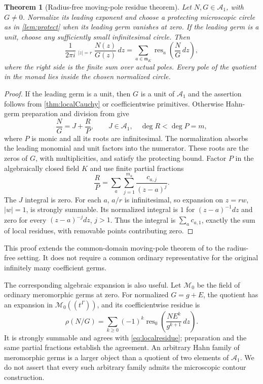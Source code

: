 \documentclass[11pt,letterpaper]{article}
\newtheorem{theorem}{Theorem}[section]
\theoremstyle{definition}
\theoremstyle{remark}
\newcommand{\Acal}{\mathscr A}
\newcommand{\m}{\mathfrak m}
\newcommand{\res}{\operatorname{res}}
\newcommand{\HCoint}{\mathop{\oint^{\!H}}\nolimits}
\numberwithin{equation}{section}
\begin{document}
\begin{theorem}[Radius-free moving-pole residue theorem]\label{thm:localresidue}
Let $N,G\in\Acal_1$, with $G\ne0$. Normalize its leading exponent and choose a protecting microscopic circle as in \cref{lem:protect} when its leading germ vanishes at zero. If the leading germ is a unit, choose any sufficiently small infinitesimal circle. Then
\begin{equation}\label{eq:localresidue}
\frac1{2\pi i}\HCoint_{|z|=r}\frac{N(z)}{G(z)}\,dz
=\sum_{a\in\m_K}\res_a\left(\frac NG\,dz\right),
\end{equation}
where the right side is the finite sum over actual poles. Every pole of the quotient in the monad lies inside the chosen normalized circle.
\end{theorem}
\begin{proof}
If the leading germ is a unit, then $G$ is a unit of $\Acal_1$ and the assertion follows from \cref{thm:localCauchy} or coefficientwise primitives. Otherwise Hahn-germ preparation and division from \cite[\S4]{AG} give
\[
\frac NG=J+\frac RP,\qquad J\in\Acal_1,\quad
\deg R<\deg P=m,
\]
where $P$ is monic and all its roots are infinitesimal. The normalization absorbs the leading monomial and unit factors into the numerator. These roots are the zeros of $G$, with multiplicities, and satisfy the protecting bound. Factor $P$ in the algebraically closed field $K$ and use finite partial fractions
\[
\frac RP=\sum_a\sum_{j=1}^{m_a}\frac{c_{a,j}}{(z-a)^j}.
\]
The $J$ integral is zero. For each $a$, $a/r$ is infinitesimal, so expansion on $z=rw$, $|w|=1$, is strongly summable. Its normalized integral is $1$ for $(z-a)^{-1}dz$ and zero for every $(z-a)^{-j}dz$, $j>1$. Thus the integral is $\sum_a c_{a,1}$, exactly the sum of local residues, with removable points contributing zero.
\end{proof}
This proof extends the common-domain moving-pole theorem of \cite{SA} to the radius-free setting. It does not require a common ordinary representative for the original infinitely many coefficient germs.

The corresponding algebraic expansion is also useful. Let $\mathcal M_0$ be the field of ordinary meromorphic germs at zero. For normalized $G=g+E$, the quotient has an expansion in $\mathcal M_0((t^\Gamma))$, and its coefficientwise residue is
\begin{equation}\label{eq:rho}
\rho(N/G)=\sum_{k\ge0}(-1)^k
 \res_0\left(\frac{N E^k}{g^{k+1}}\,dz\right).
\end{equation}
It is strongly summable and agrees with \eqref{eq:localresidue}; preparation and the same partial fractions establish the agreement. An arbitrary Hahn family of meromorphic germs is a larger object than a quotient of two elements of $\Acal_1$. We do not assert that every such arbitrary family admits the microscopic contour construction.
\end{document}

